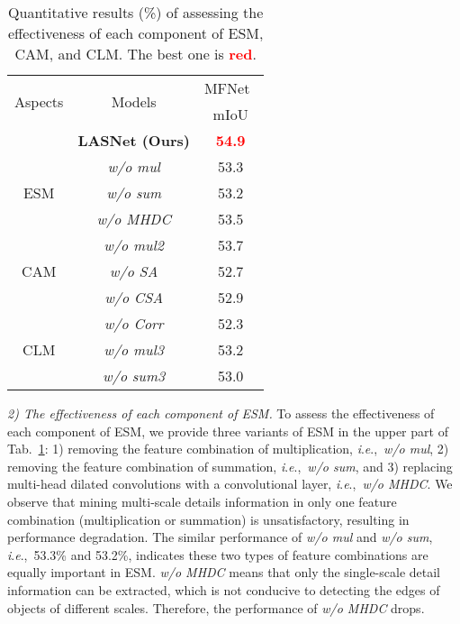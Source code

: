 \documentclass[journal]{IEEEtran}
\newcommand{\ie}{\textit{i}.\textit{e}.,~}
\begin{document}
\begin{table}[!t]
\centering
\small
\caption{Quantitative results (\%) of assessing the effectiveness of each component of ESM, CAM, and CLM.
  The best one is \textcolor{red}{\textbf{red}}.
  }
\label{Ab_ESMCAMCLM}
\renewcommand{\arraystretch}{1.4}
\renewcommand{\tabcolsep}{4.3mm}
\small
\begin{tabular}{c|c||c}
\bottomrule
   \multirow{2}{*}{Aspects} & \multirow{2}{*}{Models}  & MFNet~\cite{2017MFNet}  \\
 \cline{3-3}
  &   & mIoU  \\\hline
\hline
& \textbf{LASNet (Ours)}  & \textcolor{red}{\textbf{54.9}}  \\

\hline
  \multirow{3}{*}{\begin{sideways}ESM\end{sideways}}
& \textit{w/o mul}       	       &  53.3   \\ 
& \textit{w/o sum}        	       &  53.2   \\ 
& \textit{w/o MHDC}                 & 53.5    \\ 

\hline
  \multirow{3}{*}{\begin{sideways}CAM\end{sideways}}
& \textit{w/o mul2}              &  53.7   \\
& \textit{w/o SA}               &  52.7 \\ 
& \textit{w/o CSA}            &  52.9 \\

\hline
  \multirow{3}{*}{\begin{sideways}CLM\end{sideways}}
& \textit{w/o Corr}         & 52.3     \\ 
& \textit{w/o mul3}         &  53.2  \\ 
& \textit{w/o sum3}       &  53.0   \\ 

\toprule
\end{tabular}
\end{table}




\textit{2) The effectiveness of each component of ESM.}
To assess the effectiveness of each component of ESM, we provide three variants of ESM in the upper part of Tab.~\ref{Ab_ESMCAMCLM}:
1) removing the feature combination of multiplication, \ie \textit{w/o mul},
2) removing the feature combination of summation, \ie \textit{w/o sum}, and 
3) replacing multi-head dilated convolutions with a convolutional layer, \ie \textit{w/o MHDC}.
We observe that mining multi-scale details information in only one feature combination (multiplication or summation) is unsatisfactory, resulting in performance degradation.
The similar performance of \textit{w/o mul} and \textit{w/o sum}, \ie 53.3\% and 53.2\%, indicates these two types of feature combinations are equally important in ESM.
\textit{w/o MHDC} means that only the single-scale detail information can be extracted, which is not conducive to detecting the edges of objects of different scales.
Therefore, the performance of \textit{w/o MHDC} drops.
\end{document}
